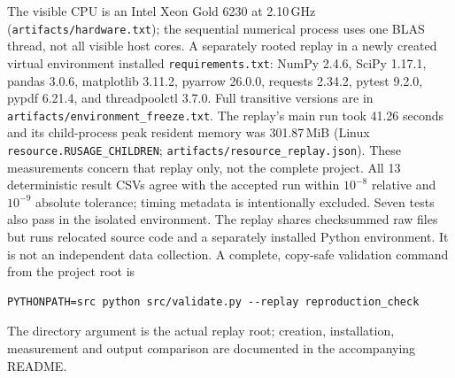 The visible CPU is an Intel Xeon Gold 6230 at 2.10\,GHz (\texttt{artifacts/hardware.txt}); the sequential numerical process uses one BLAS thread, not all visible host cores. A separately rooted replay in a newly created virtual environment installed \texttt{requirements.txt}: NumPy 2.4.6, SciPy 1.17.1, pandas 3.0.6, matplotlib 3.11.2, pyarrow 26.0.0, requests 2.34.2, pytest 9.2.0, pypdf 6.21.4, and threadpoolctl 3.7.0. Full transitive versions are in \texttt{artifacts/environment\_freeze.txt}. The replay's main run took 41.26 seconds and its child-process peak resident memory was 301.87\,MiB (Linux \texttt{resource.RUSAGE\_CHILDREN}; \texttt{artifacts/resource\_replay.json}). These measurements concern that replay only, not the complete project. All 13 deterministic result CSVs agree with the accepted run within $10^{-8}$ relative and $10^{-9}$ absolute tolerance; timing metadata is intentionally excluded. Seven tests also pass in the isolated environment. The replay shares checksummed raw files but runs relocated source code and a separately installed Python environment. It is not an independent data collection. A complete, copy-safe validation command from the project root is
\begin{verbatim}
PYTHONPATH=src python src/validate.py --replay reproduction_check
\end{verbatim}
The directory argument is the actual replay root; creation, installation, measurement and output comparison are documented in the accompanying README.


